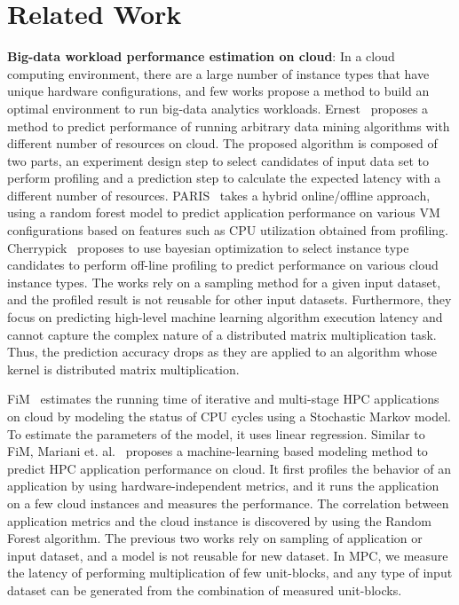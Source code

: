 \documentclass[10pt, conference, compsocconf]{IEEEtran}
\begin{document}
\section{Related Work}\label{sec:relatedwork}
\textbf{Big-data workload performance estimation on cloud}: In a cloud computing environment, there are a large number of instance types that have unique hardware configurations, and few works propose a method to build an optimal environment to run big-data analytics workloads. Ernest~\cite{ernest} proposes a method to predict performance of running arbitrary data mining algorithms with different number of resources on cloud. The proposed algorithm is composed of two parts, an experiment design step to select candidates of input data set to perform profiling and a prediction step to calculate the expected latency with a different number of resources. PARIS~\cite{paris} takes a hybrid online/offline approach, using a random forest model to predict application performance on various VM configurations based on features such as CPU utilization obtained from profiling. Cherrypick~\cite{cherrypick} proposes to use bayesian optimization to select instance type candidates to perform off-line profiling to predict performance on various cloud instance types. The works rely on a sampling method for a given input dataset, and the profiled result is not reusable for other input datasets. Furthermore, they focus on predicting high-level machine learning algorithm execution latency and cannot capture the complex nature of a distributed matrix multiplication task. Thus, the prediction accuracy drops as they are applied to an algorithm whose kernel is distributed matrix multiplication.

FiM~\cite{fim} estimates the running time of iterative and multi-stage HPC applications on cloud by modeling the status of CPU cycles using a Stochastic Markov model. To estimate the parameters of the model, it uses linear regression. Similar to FiM, Mariani et. al.~\cite{hpc-cloud-predict} proposes a machine-learning based modeling method to predict HPC application performance on cloud. It first profiles the behavior of an application by using hardware-independent metrics, and it runs the application on a few cloud instances and measures the performance. The correlation between application metrics and the cloud instance is discovered by using the Random Forest algorithm. The previous two works rely on sampling of application or input dataset, and a model is not reusable for new dataset. In MPC, we measure the latency of performing multiplication of few unit-blocks, and any type of input dataset can be generated from the combination of measured unit-blocks.
\end{document}
